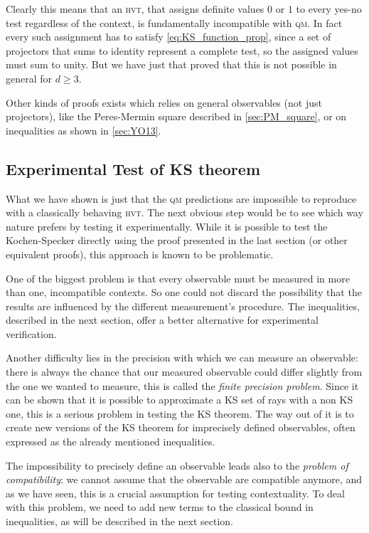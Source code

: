 \documentclass[a4paper]{article}
\newcommand{\acron}[1]{\textsc{#1}}
\newcommand{\HVT}{\acron{hvt}}
\newcommand{\QM}{\acron{qm}}
\theoremstyle{definition}
\begin{document}
Clearly this means that an \HVT{}, that assigns definite values $0$ or $1$ to every
yes-no test regardless of the context, is fundamentally incompatible with \QM{}.
In fact every such assignment has to satisfy \eqref{eq:KS_function_prop}, since a
set of projectors that sums to identity represent a complete test, so the
assigned values must sum to unity.
But we have just that proved that this is not possible in general for $d \ge 3$.

Other kinds of proofs exists which relies on general observables (not just
projectors), like the Peres-Mermin square described in \ref{sec:PM_square}, or
on inequalities as shown in \ref{sec:YO13}.

\subsection{Experimental Test of KS theorem}
What we have shown is just that the \QM{} predictions are impossible to reproduce
with a classically behaving \HVT{}.
The next obvious step would be to see which way nature prefers by testing it
experimentally.
While it is possible to test the Kochen-Specker directly using the proof presented
in the last section (or other equivalent proofs), this approach is known to be
problematic.

One of the biggest problem is that every observable must be measured in more
than one, incompatible contexts. So one could not discard the possibility that
the results are influenced by the different measurement's procedure.
The inequalities, described in the next section, offer a better alternative for
experimental verification.

Another difficulty lies in the precision with which we can measure an
observable: there is always the chance that our measured observable could
differ slightly from the one we wanted to measure, this is called the \emph{finite
precision problem}.
Since it can be shown that it is possible to approximate a \acron{KS} set of rays with a
non \acron{KS} one, this is a serious problem in testing the \acron{KS}
theorem.
The way out of it is to create new versions of the \acron{KS} theorem
for imprecisely defined observables, often expressed as the already mentioned
inequalities.

The impossibility to precisely define an observable leads also to the
\emph{problem of compatibility}: we cannot assume that the observable are
compatible anymore, and as we have seen, this is a crucial assumption for
testing contextuality.
To deal with this problem, we need to add new terms to the classical bound in
inequalities, as will be described in the next section.
\end{document}
